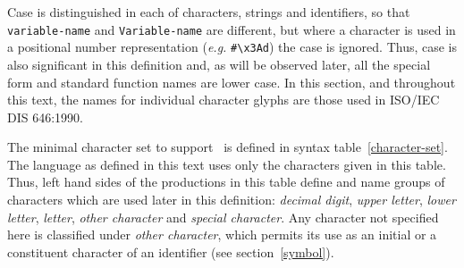 \label{syntax}
\begin{optDefinition}
%
Case is distinguished in each of characters,
strings and identifiers, so that {\tt variable-name} and {\tt Variable-name} are
different, but where a character is used in a positional number representation
({\em e.g.} \verb+#\x3Ad+) the case is ignored.  Thus, case is also significant
in this definition and, as will be observed later, all the special form and
standard function names are lower case.  In this section, and throughout this
text, the names for individual character glyphs are those used in ISO/IEC DIS
646:1990.

The minimal character set
 to support \eulisp\ is defined
in syntax table~\ref{character-set}.  The language as defined in this text uses
only the characters given in this table.  Thus, left hand sides of the
productions in this table define and name groups of characters which are used
later in this definition: {\em decimal digit}, {\em upper letter}, {\em lower
    letter}, {\em letter}, {\em other character} and {\em special character}.
Any character not specified here is classified under {\em other character},
which permits its use as an initial or a constituent character of an identifier
(see section~\ref{symbol}).
%
\Syntax
\label{character-set}
%
\end{optDefinition}
